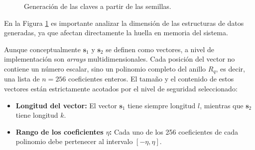 \documentclass[11pt, a4paper]{report}
\theoremstyle{definition}
\begin{document}
\begin{figure}[H]
{
    }
    \caption{Generación de las claves a partir de las semillas.}
    \label{fig:keygen_estructuras}
\end{figure}

En la Figura \ref{fig:keygen_estructuras} es importante analizar la dimensión de las estructuras de datos generadas, ya que afectan directamente la huella en memoria del sistema. 

Aunque conceptualmente $\mathbf{s}_1$ y $\mathbf{s}_2$ se definen como vectores, a nivel de implementación son \textit{arrays} multidimensionales. Cada posición del vector no contiene un número escalar, sino un polinomio completo del anillo $R_q$, es decir, una lista de $n = 256$ coeficientes enteros. El tamaño y el contenido de estos vectores están estrictamente acotados por el nivel de seguridad seleccionado:

\begin{itemize}
    \item \textbf{Longitud del vector:} El vector $\mathbf{s}_1$ tiene siempre longitud $l$, mientras que $\mathbf{s}_2$ tiene longitud $k$.
    \item \textbf{Rango de los coeficientes $\eta$:} Cada uno de los 256 coeficientes de cada polinomio debe pertenecer al intervalo $[-\eta, \eta]$.
\end{itemize}
\end{document}
